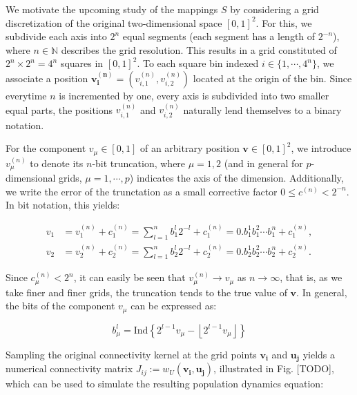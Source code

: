 \documentclass[10pt,letterpaper]{article}
\renewcommand{\vec}[1]{\boldsymbol{#1}}
\begin{document}
We motivate the upcoming study of the mappings $S$ by considering a grid discretization of the original two-dimensional space $[0,1]^2$. For this, we subdivide each axis into $2^n$ equal segments (each segment has a length of $2^{-n}$), where $n \in \mathbb{N}$ describes the grid resolution. This results in a grid constituted of $2^n \times 2^n = 4^n$ squares in $[0,1]^2$. To each square bin indexed $i \in \{1,\cdots,4^n\}$, we associate a position $\vec{v_i^{(n)}} = (v_{i,1}^{(n)}, v_{i,2}^{(n)})$ located at the origin of the bin. Since everytime $n$ is incremented by one, every axis is subdivided into two smaller equal parts, the positions $v_{i,1}^{(n)}$ and $v_{i,2}^{(n)}$ naturally lend themselves to a binary notation.

For the component $v_\mu \in [0,1]$ of an arbitrary position $\vec{v} \in [0,1]^2$, we introduce $v_\mu^{(n)}$ to denote its $n$-bit truncation, where $\mu = 1,2$ (and in general for $p$-dimensional grids, $\mu=1, \cdots, p$) indicates the axis of the dimension. Additionally, we write the error of the trunctation as a small corrective factor $0 \leq c^{(n)} < 2^{-n}$. In bit notation, this yields: 

\begin{equation} \begin{aligned} \label{eq:positions-v}
v_1 &= v_1^{(n)} + c_1^{(n)} = \sum_{l=1}^n b_1^l 2^{-l} + c_1^{(n)} = 0.b_1^1 b_1^2 \cdots b_1^n + c_1^{(n)}, \\
v_2 &= v_2^{(n)} + c_2^{(n)} = \sum_{l=1}^n b_2^l 2^{-l} + c_2^{(n)} = 0.b_2^1 b_2^2 \cdots b_2^n + c_2^{(n)}.
\end{aligned}\end{equation}

Since $c_\mu^{(n)} < 2^n$, it can easily be seen that $v_\mu^{(n)} \to v_\mu$ as $n\to\infty$, that is, as we take finer and finer grids, the truncation tends to the true value of $\vec{v}$. In general, the bits of the component $v_\mu$ can be expressed as:

\begin{equation*}
b_\mu^l = \mathrm{Ind} \left\{ 2^{l-1}v_\mu - \left\lfloor 2^{l-1}v_\mu \right\rfloor \right\}
\end{equation*}

Sampling the original connectivity kernel at the grid points $\vec{v_i}$ and $\vec{u_j}$ yields a numerical connectivity matrix $J_{ij} := w_U(\vec{v_i}, \vec{u_j})$, illustrated in Fig. [TODO], which can be used to simulate the resulting population dynamics equation:
\end{document}
